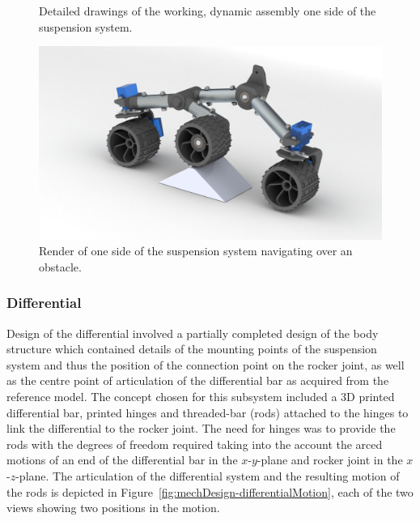\begin{figure}[h!]
{      }
      \caption[Detailed drawings of the working, dynamic assembly one side of the suspension system.]{Detailed drawings of the working, dynamic assembly one side of the suspension system.}
      \label{fig:mechDesign-suspensionSubDetail}
      \end{figure}
      
      \begin{figure}[h!]
        \centering
        \includegraphics[width=1\linewidth]{figures/suspensionSub-obstacle}
        \caption[Render of one side of the suspension system navigating over an obstacle.]{Render of one side of the suspension system navigating over an obstacle.}
        \label{fig:mechDesign-suspensionSubObstacle}
      \end{figure}
      
    \subsubsection{Differential}
      Design of the differential involved a partially completed design of the body structure which contained details of the mounting points of the suspension system and thus the position of the connection point on the rocker joint, as well as the centre point of articulation of the differential bar as acquired from the reference model. The concept chosen for this subsystem included a 3D printed differential bar, printed hinges and threaded-bar (rods) attached to the hinges to link the differential to the rocker joint. The need for hinges was to provide the rods with the degrees of freedom required taking into the account the arced motions of an end of the differential bar in the $x$-$y$-plane and rocker joint in the $x$-$z$-plane. The articulation of the differential system and the resulting motion of the rods is depicted in Figure~\ref{fig:mechDesign-differentialMotion}, each of the two views showing two positions in the motion.
      
